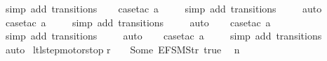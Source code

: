 \begin{isabellebody}
\ {\isacharparenleft}simp\ add{\isacharcolon}\ transitions{\isacharparenright}\isanewline
\ \ \isamarkupfalse%
\ {\isacharparenleft}case{\isacharunderscore}tac\ {\isachardoublequoteopen}a{\isacharequal}{}{\isachardoublequoteclose}{\isacharparenright}\isanewline
\ \ \ \isamarkupfalse%
\ {\isacharparenleft}simp\ add{\isacharcolon}\ transitions{\isacharparenright}\isanewline
\ \ \ \isamarkupfalse%
\ auto{\isacharbrackleft}{}{\isacharbrackright}\isanewline
\ \ \isamarkupfalse%
\ {\isacharparenleft}case{\isacharunderscore}tac\ {\isachardoublequoteopen}a{\isacharequal}{}{\isachardoublequoteclose}{\isacharparenright}\isanewline
\ \ \ \isamarkupfalse%
\ {\isacharparenleft}simp\ add{\isacharcolon}\ transitions{\isacharparenright}\isanewline
\ \ \ \isamarkupfalse%
\ auto{\isacharbrackleft}{}{\isacharbrackright}\isanewline
\ \ \isamarkupfalse%
\ {\isacharparenleft}case{\isacharunderscore}tac\ {\isachardoublequoteopen}a{\isacharequal}{}{\isachardoublequoteclose}{\isacharparenright}\isanewline
\ \ \ \isamarkupfalse%
\ {\isacharparenleft}simp\ add{\isacharcolon}\ transitions{\isacharparenright}\isanewline
\ \ \ \isamarkupfalse%
\ auto{\isacharbrackleft}{}{\isacharbrackright}\isanewline
\ \ \isamarkupfalse%
\ {\isacharparenleft}case{\isacharunderscore}tac\ {\isachardoublequoteopen}a{\isacharequal}{}{\isachardoublequoteclose}{\isacharparenright}\isanewline
\ \ \ \isamarkupfalse%
\ {\isacharparenleft}simp\ add{\isacharcolon}\ transitions{\isacharparenright}\isanewline
\ \ \isamarkupfalse%
\ auto%
\endisatagproof
{\isafoldproof}%
%
\isadelimproof
\isanewline
%
\endisadelimproof
\isanewline
{}\isamarkupfalse%
\ ltl{\isacharunderscore}step{\isacharunderscore}motorstop{\isacharcolon}\isanewline
{\isachardoublequoteopen}r\ {\isachardollar}\ {}\ {\isacharequal}\ Some\ {\isacharparenleft}EFSM{\isachardot}Str\ {\isacharprime}{\isacharprime}true{\isacharprime}{\isacharprime}{\isacharparenright}\ {\isasymLongrightarrow}\isanewline
\ n\ {\isasymin}\ {\isacharbraceleft}{}{\isacharcomma}\ {}{\isacharcomma}\ {}{\isacharcomma}\ {}{\isacharbraceright}\ {\isasymLongrightarrow}\isanewline

\end{isabellebody}
